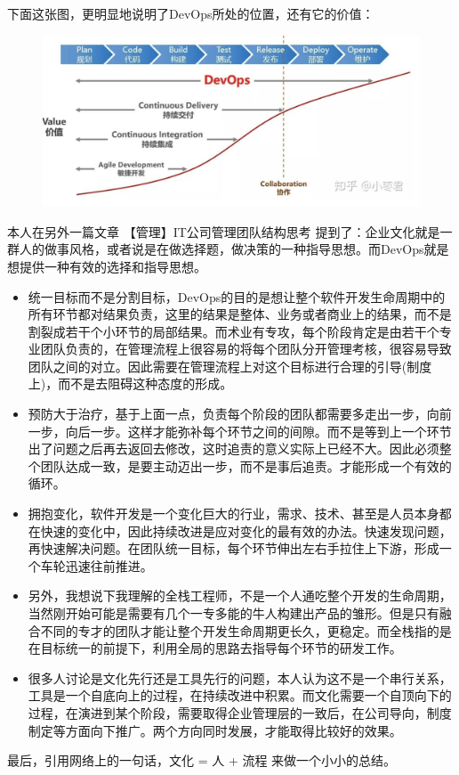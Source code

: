 \documentclass[12pt]{article}
\begin{document}
下面这张图，更明显地说明了DevOps所处的位置，还有它的价值：

\begin{figure}[H]
    \centering
    \includegraphics[width=.6\textwidth]{fig/DevOps_Value.png}
\end{figure}

本人在另外一篇文章 【管理】IT公司管理团队结构思考 提到了：企业文化就是一群人的做事风格，或者说是在做选择题，做决策的一种指导思想。而DevOps就是想提供一种有效的选择和指导思想。
\begin{itemize}
\setlength{\itemsep}{0pt}
\setlength{\parsep}{0pt}
\setlength{\parskip}{0pt}
    \item 统一目标而不是分割目标，DevOps的目的是想让整个软件开发生命周期中的所有环节都对结果负责，这里的结果是整体、业务或者商业上的结果，而不是割裂成若干个小环节的局部结果。而术业有专攻，每个阶段肯定是由若干个专业团队负责的，在管理流程上很容易的将每个团队分开管理考核，很容易导致团队之间的对立。因此需要在管理流程上对这个目标进行合理的引导(制度上)，而不是去阻碍这种态度的形成。

    \item 预防大于治疗，基于上面一点，负责每个阶段的团队都需要多走出一步，向前一步，向后一步。这样才能弥补每个环节之间的间隙。而不是等到上一个环节出了问题之后再去返回去修改，这时追责的意义实际上已经不大。因此必须整个团队达成一致，是要主动迈出一步，而不是事后追责。才能形成一个有效的循环。
    
    \item 拥抱变化，软件开发是一个变化巨大的行业，需求、技术、甚至是人员本身都在快速的变化中，因此持续改进是应对变化的最有效的办法。快速发现问题，再快速解决问题。在团队统一目标，每个环节伸出左右手拉住上下游，形成一个车轮迅速往前推进。

    \item 另外，我想说下我理解的全栈工程师，不是一个人通吃整个开发的生命周期，当然刚开始可能是需要有几个一专多能的牛人构建出产品的雏形。但是只有融合不同的专才的团队才能让整个开发生命周期更长久，更稳定。而全栈指的是在目标统一的前提下，利用全局的思路去指导每个环节的研发工作。

    \item 很多人讨论是文化先行还是工具先行的问题，本人认为这不是一个串行关系，工具是一个自底向上的过程，在持续改进中积累。而文化需要一个自顶向下的过程，在演进到某个阶段，需要取得企业管理层的一致后，在公司导向，制度制定等方面向下推广。两个方向同时发展，才能取得比较好的效果。
\end{itemize}

最后，引用网络上的一句话，文化 = 人 + 流程 来做一个小小的总结。




\end{document}
